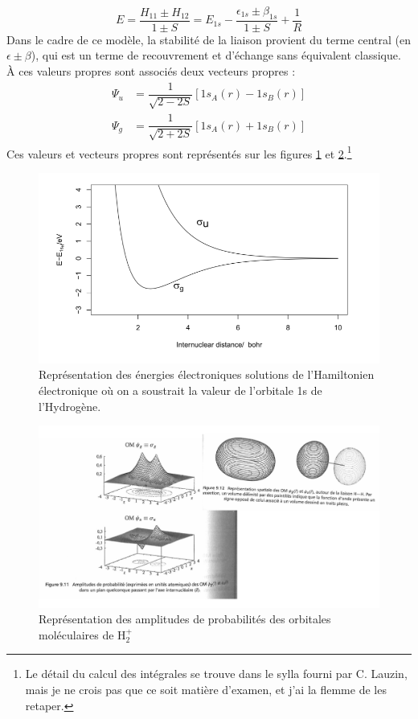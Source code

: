 \[ E = \dfrac{H_{11} \pm H_{12}}{1\pm S} = E_{1s} - \dfrac{\epsilon_{1s}\pm\beta_{1s}}{1\pm S} +\dfrac{1}{R} \]
Dans le cadre de ce modèle, la stabilité de la liaison provient du terme central (en $\epsilon\pm\beta$), qui est un terme de recouvrement et d'échange sans équivalent classique.
À ces valeurs propres sont associés deux vecteurs propres :
\begin{align*}
    \Psi_u &= \dfrac{1}{\sqrt{2-2S}}[1s_A(r)-1s_B(r)]\\
    \Psi_g &= \dfrac{1}{\sqrt{2+2S}}[1s_A(r)+1s_B(r)]
\end{align*}
Ces valeurs et vecteurs propres sont représentés sur les figures \ref{fig:Ham} et \ref{fig:Amp}.\footnote{Le détail du calcul des intégrales se trouve dans le sylla fourni par C. Lauzin, mais je ne crois pas que ce soit matière d'examen, et j'ai la flemme de les retaper.}
\begin{figure}[htpb]
    \centering
    \includegraphics[scale = 0.8]{Images3/LCAOHamiltonien.PNG}
    \caption{Représentation des énergies électroniques solutions de l’Hamiltonien
    électronique où on a soustrait la valeur de l’orbitale 1s de l’Hydrogène.}
    \label{fig:Ham}
\end{figure}
\begin{figure}[htpb]
    \centering
    \includegraphics[scale = 0.65]{Images3/LCAOAmplitudes.PNG}
    \caption{Représentation des amplitudes de probabilités des orbitales
    moléculaires de H$_2^+$}
    \label{fig:Amp}
\end{figure}


